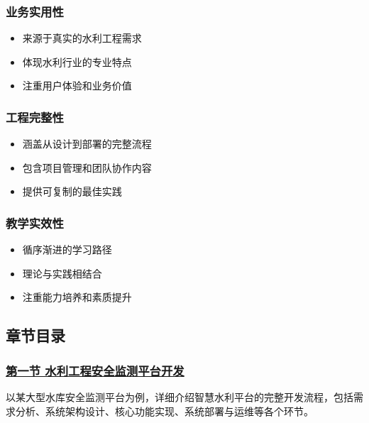 \subsubsection{业务实用性}\label{ux4e1aux52a1ux5b9eux7528ux6027}

\begin{itemize}
\tightlist
\item
  来源于真实的水利工程需求
\item
  体现水利行业的专业特点
\item
  注重用户体验和业务价值
\end{itemize}

\subsubsection{工程完整性}\label{ux5de5ux7a0bux5b8cux6574ux6027}

\begin{itemize}
\tightlist
\item
  涵盖从设计到部署的完整流程
\item
  包含项目管理和团队协作内容
\item
  提供可复制的最佳实践
\end{itemize}

\subsubsection{教学实效性}\label{ux6559ux5b66ux5b9eux6548ux6027}

\begin{itemize}
\tightlist
\item
  循序渐进的学习路径
\item
  理论与实践相结合
\item
  注重能力培养和素质提升
\end{itemize}

\subsection{章节目录}\label{ux7ae0ux8282ux76eeux5f55}

\subsubsection{\texorpdfstring{\href{section08-01.md}{第一节
水利工程安全监测平台开发}}{第一节 水利工程安全监测平台开发}}\label{ux7b2cux4e00ux8282-ux6c34ux5229ux5de5ux7a0bux5b89ux5168ux76d1ux6d4bux5e73ux53f0ux5f00ux53d1}

以某大型水库安全监测平台为例，详细介绍智慧水利平台的完整开发流程，包括需求分析、系统架构设计、核心功能实现、系统部署与运维等各个环节。

